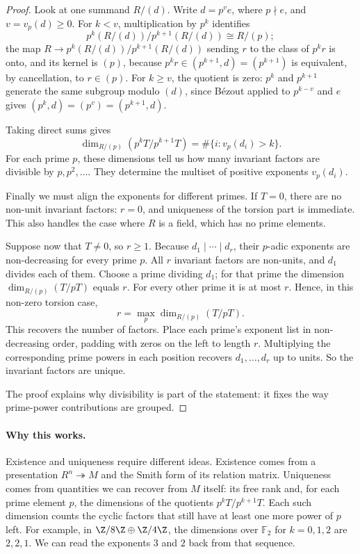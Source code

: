 \begin{proof}
Look at one summand $R/(d)$.
Write $d=p^ve$, where $p\nmid e$,
and $v=v_p(d)\ge0$.
For $k<v$, multiplication by $p^k$
identifies
\[
p^k(R/(d))/p^{k+1}(R/(d))
\cong R/(p);
\]
the map $R\to p^k(R/(d))/p^{k+1}(R/(d))$
sending $r$ to the class of $p^kr$
is onto, and its kernel is $(p)$,
because $p^kr\in(p^{k+1},d)=(p^{k+1})$ is equivalent, by
cancellation, to $r\in(p)$. For $k\ge v$,
the quotient is zero: $p^k$ and $p^{k+1}$
generate the same subgroup modulo $(d)$,
since Bézout applied to $p^{k-v}$ and $e$ gives
$(p^k,d)=(p^v)=(p^{k+1},d)$.

Taking direct sums gives
\[
\dim_{R/(p)}(p^kT/p^{k+1}T)
=\#\{i:v_p(d_i)>k\}.
\]
For each prime $p$, these dimensions
tell us how many invariant factors
are divisible by $p,p^2,\ldots$.
They determine the multiset of positive
exponents $v_p(d_i)$.

Finally we must align the exponents
for different primes. If $T=0$, there
are no non-unit invariant factors:
$r=0$, and uniqueness of the torsion
part is immediate. This also handles
the case where $R$ is a field,
which has no prime elements.

Suppose now that $T\ne0$, so $r\ge1$.
Because $d_1\mid\cdots\mid d_r$, their
$p$-adic exponents are non-decreasing
for every prime $p$. All $r$ invariant
factors are non-units, and $d_1$
divides each of them. Choose a prime
dividing $d_1$; for that prime the
dimension $\dim_{R/(p)}(T/pT)$ equals $r$.
For every other prime it is at most $r$.
Hence, in this non-zero torsion case,
\[
r=\max_p\dim_{R/(p)}(T/pT).
\]
This recovers the number of factors.
Place each prime's exponent list in
non-decreasing order, padding with
zeros on the left to length $r$.
Multiplying the corresponding
prime powers in each position
recovers $d_1,\ldots,d_r$ up to units.
So the invariant factors are unique.

The proof explains why divisibility is
part of the statement: it fixes the way
prime-power contributions are grouped.
\end{proof}

\paragraph{Why this works.}
Existence and uniqueness require different ideas. Existence comes from a presentation $R^n\twoheadrightarrow M$ and the Smith form of its relation matrix. Uniqueness comes from quantities we can recover from $M$ itself: its free rank and, for each prime element $p$, the dimensions of the quotients $p^kT/p^{k+1}T$. Each such dimension counts the cyclic factors that still have at least one more power of $p$ left. For example, in $\Z/8\Z\oplus\Z/4\Z$, the dimensions over $\mathbb F_2$ for $k=0,1,2$ are $2,2,1$. We can read the exponents $3$ and $2$ back from that sequence.

